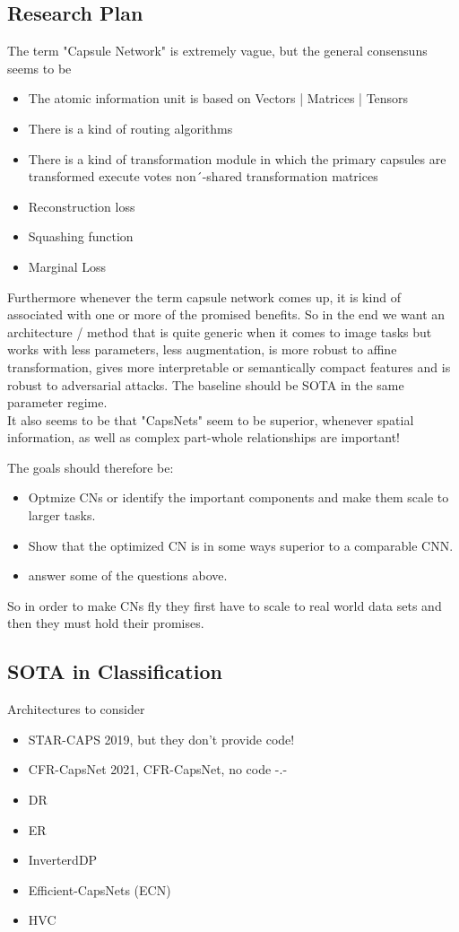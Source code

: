 \documentclass{article}
\begin{document}
\subsection{Research Plan}
The term "Capsule Network" is extremely vague, but the general consensuns seems to be
\begin{itemize}
	\item The atomic information unit is based on Vectors | Matrices | Tensors
	\item There is a kind of routing algorithms
	\item There is a kind of transformation module in which the primary capsules are transformed execute votes non´-shared transformation matrices 
	\item Reconstruction loss
	\item Squashing function
	\item Marginal Loss
\end{itemize}
Furthermore whenever the term capsule network comes up, it is kind of associated with one or more of the promised benefits.
So in the end we want an architecture / method that is quite generic when it comes to image tasks but works with less parameters, less augmentation, is more robust to affine transformation, gives more interpretable or semantically compact features and is robust to adversarial attacks. The baseline should be SOTA in the same parameter regime. \\

It also seems to be that "CapsNets" seem to be superior, whenever spatial information, as well as complex part-whole relationships are important! 

The goals should therefore be:
\begin{itemize}
	\item Optmize CNs or identify the important components and make them scale to larger tasks.
	\item Show that the optimized CN is in some ways superior to a comparable CNN.
	\item answer some of the questions above.
\end{itemize}
So in order to make CNs fly they first have to scale to real world data sets and then they must hold their promises.

\subsection{SOTA in Classification}
Architectures to consider
\begin{itemize}
	\item STAR-CAPS \cite{nips/AhmedT19} 2019, but they don't provide code!
	\item CFR-CapsNet \cite{access/WangLYC21} 2021, CFR-CapsNet, no code -.-
	\item DR \cite{nips/SabourFH17}
	\item ER \cite{iclr/HintonSF18}
	\item InverterdDP \cite{iclr/TsaiSGS20}
	\item Efficient-CapsNets (ECN) \cite{DBLP:journals/corr/Mazzia2021}
	\item HVC \cite{ijon/ByerlyKD21}
\end{itemize}
\end{document}
